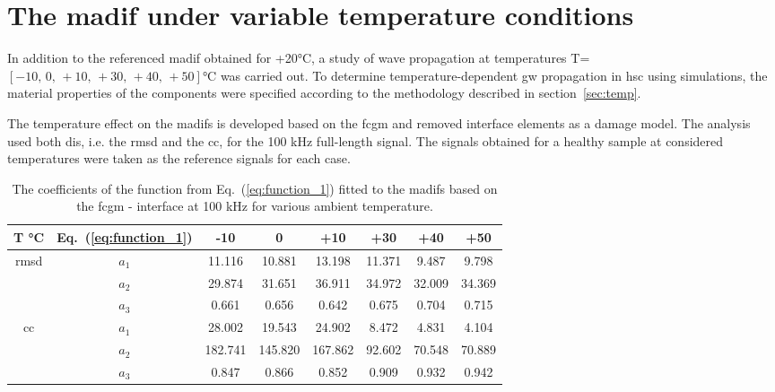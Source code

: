\section{The \acs{madif} under variable temperature conditions}
\label{sec:madifTemp}

In addition to the referenced \ac{madif} obtained for +20\unit{\degreeCelsius}, a study of wave propagation at temperatures T=\(\left[-10,\,0,\,+10,\,+30,\,+40,\,+50\right]\)\unit{\degreeCelsius} was carried out.
To determine temperature-dependent \ac{gw} propagation in \ac{hsc} using simulations, the material properties of the components were specified according to the methodology described in section~\ref{sec:temp}.

The temperature effect on the \acp{madif} is developed based on the \ac{fcgm} and removed interface elements as a damage model.
The analysis used both \acp{di}, i.e. the \ac{rmsd} and the \ac{cc}, for the 100 \unit{\kHz} full-length signal.
The signals obtained for a healthy sample at considered temperatures were taken as the reference signals for each case.
\begin{table}[!tbh]
	\small
	\tabcolsep=0.25cm
	\centering
	\caption{\label{tab:fit_F_err_temp} The coefficients of the function from Eq.~(\ref{eq:function_1}) fitted to the \acfp{madif} based on the \acf{fcgm} - interface at 100 \unit{\kHz} for various ambient temperature.}
	\begin{tabular}{cccccccc}
		\toprule
		{T \unit{\degreeCelsius}} & Eq.~(\ref{eq:function_1}) & -10 & 0 & +10 & +30 & +40 & +50\\
		\midrule
		\multirow{3}{*}{\ac{rmsd}} & $a_1$ & 11.116 & 10.881 & 13.198 & 11.371 & 9.487 & 9.798\\
		 & $a_2$ & 29.874 & 31.651 & 36.911 & 34.972 & 32.009 & 34.369\\
		 & $a_3$ & 0.661 & 0.656 & 0.642 & 0.675 & 0.704 & 0.715\\
		\midrule
		\multirow{3}{*}{\ac{cc}} & $a_1$ & 28.002 & 19.543 & 24.902 & 8.472 & 4.831 & 4.104\\
		& $a_2$ & 182.741 & 145.820 & 167.862 & 92.602 & 70.548 & 70.889\\
		& $a_3$ & 0.847 & 0.866 & 0.852 & 0.909 & 0.932 & 0.942\\
		\bottomrule
	\end{tabular}
\end{table}


